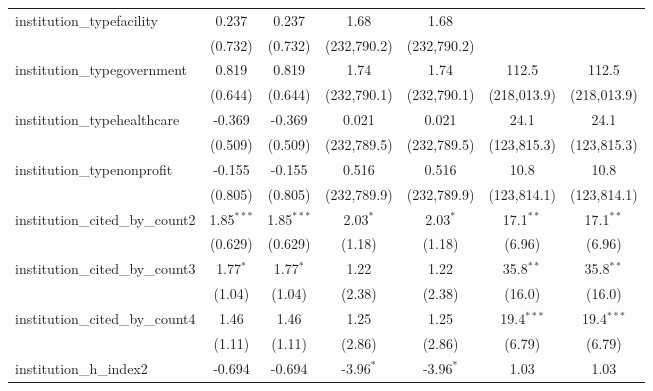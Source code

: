 \begin{tabular}{lcccccc}
   institution\_typefacility             & 0.237          & 0.237          & 1.68          & 1.68          &               &   \\   
                                         & (0.732)        & (0.732)        & (232,790.2)   & (232,790.2)   &               &   \\   
   institution\_typegovernment           & 0.819          & 0.819          & 1.74          & 1.74          & 112.5         & 112.5\\   
                                         & (0.644)        & (0.644)        & (232,790.1)   & (232,790.1)   & (218,013.9)   & (218,013.9)\\   
   institution\_typehealthcare           & -0.369         & -0.369         & 0.021         & 0.021         & 24.1          & 24.1\\   
                                         & (0.509)        & (0.509)        & (232,789.5)   & (232,789.5)   & (123,815.3)   & (123,815.3)\\   
   institution\_typenonprofit            & -0.155         & -0.155         & 0.516         & 0.516         & 10.8          & 10.8\\   
                                         & (0.805)        & (0.805)        & (232,789.9)   & (232,789.9)   & (123,814.1)   & (123,814.1)\\   
   institution\_cited\_by\_count2        & 1.85$^{***}$   & 1.85$^{***}$   & 2.03$^{*}$    & 2.03$^{*}$    & 17.1$^{**}$   & 17.1$^{**}$\\   
                                         & (0.629)        & (0.629)        & (1.18)        & (1.18)        & (6.96)        & (6.96)\\   
   institution\_cited\_by\_count3        & 1.77$^{*}$     & 1.77$^{*}$     & 1.22          & 1.22          & 35.8$^{**}$   & 35.8$^{**}$\\   
                                         & (1.04)         & (1.04)         & (2.38)        & (2.38)        & (16.0)        & (16.0)\\   
   institution\_cited\_by\_count4        & 1.46           & 1.46           & 1.25          & 1.25          & 19.4$^{***}$  & 19.4$^{***}$\\   
                                         & (1.11)         & (1.11)         & (2.86)        & (2.86)        & (6.79)        & (6.79)\\   
   institution\_h\_index2                & -0.694         & -0.694         & -3.96$^{*}$   & -3.96$^{*}$   & 1.03          & 1.03\\   

\end{tabular}

